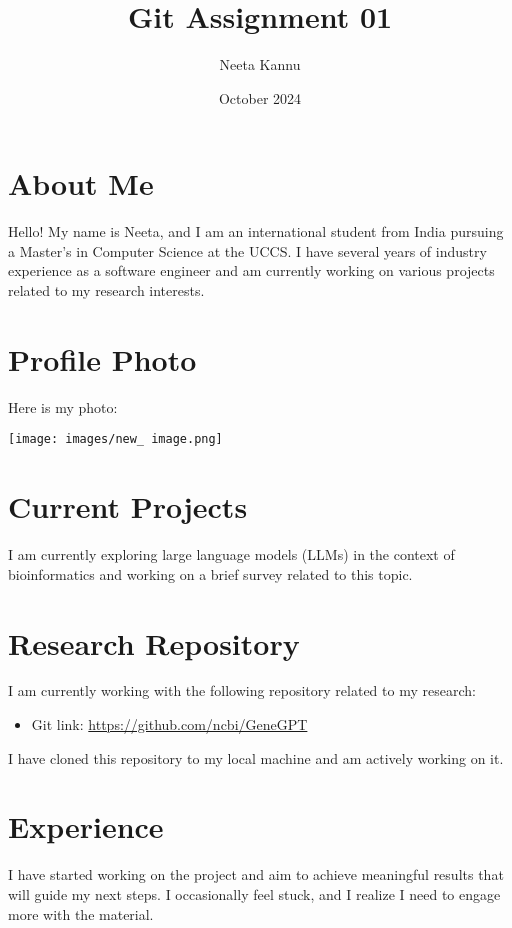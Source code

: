 ﻿\documentclass{article}
\title{Git Assignment 01}
\author{Neeta Kannu}
\date{October 2024}
\begin{document}
\maketitle

\section*{About Me}
Hello! My name is Neeta, and I am an international student from India pursuing a Master's in Computer Science at the UCCS. I have several years of industry experience as a software engineer and am currently working on various projects related to my research interests.

\section*{Profile Photo}
Here is my photo:

\begin{center}
    \texttt{[image: images/new\_ image.png]}
\end{center}

\section*{Current Projects}
I am currently exploring large language models (LLMs) in the context of bioinformatics and working on a brief survey related to this topic.

\section*{Research Repository}
I am currently working with the following repository related to my research:

\begin{itemize}
    \item Git link: \url{https://github.com/ncbi/GeneGPT}
\end{itemize}

I have cloned this repository to my local machine and am actively working on it.

\section*{Experience}
I have started working on the project and aim to achieve meaningful results that will guide my next steps. I occasionally feel stuck, and I realize I need to engage more with the material.
\end{document}
